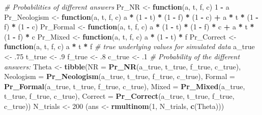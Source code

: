 \documentclass[12pt,]{krantz}
\newenvironment{Shaded}{\begin{snugshade}}{\end{snugshade}}
\newcommand{\KeywordTok}[1]{\textcolor[rgb]{0.13,0.29,0.53}{\textbf{#1}}}
\newcommand{\DataTypeTok}[1]{\textcolor[rgb]{0.13,0.29,0.53}{#1}}
\newcommand{\DecValTok}[1]{\textcolor[rgb]{0.00,0.00,0.81}{#1}}
\newcommand{\FloatTok}[1]{\textcolor[rgb]{0.00,0.00,0.81}{#1}}
\newcommand{\StringTok}[1]{\textcolor[rgb]{0.31,0.60,0.02}{#1}}
\newcommand{\CommentTok}[1]{\textcolor[rgb]{0.56,0.35,0.01}{\textit{#1}}}
\newcommand{\ControlFlowTok}[1]{\textcolor[rgb]{0.13,0.29,0.53}{\textbf{#1}}}
\newcommand{\OperatorTok}[1]{\textcolor[rgb]{0.81,0.36,0.00}{\textbf{#1}}}
\newcommand{\NormalTok}[1]{#1}
\theoremstyle{definition}
\theoremstyle{definition}
\theoremstyle{definition}
\theoremstyle{remark}
\begin{document}
\begin{Shaded}
\begin{Highlighting}[]
\CommentTok{# Probabilities of different answers}
\NormalTok{Pr_NR <-}\StringTok{ }\ControlFlowTok{function}\NormalTok{(a, t, f, c)}
    \DecValTok{1} \OperatorTok{-}\StringTok{ }\NormalTok{a}
\NormalTok{Pr_Neologism <-}\StringTok{ }\ControlFlowTok{function}\NormalTok{(a, t, f, c)}
\NormalTok{    a }\OperatorTok{*}\StringTok{ }\NormalTok{(}\DecValTok{1} \OperatorTok{-}\StringTok{ }\NormalTok{t) }\OperatorTok{*}\StringTok{ }\NormalTok{(}\DecValTok{1} \OperatorTok{-}\StringTok{ }\NormalTok{f) }\OperatorTok{*}\StringTok{ }\NormalTok{(}\DecValTok{1} \OperatorTok{-}\StringTok{ }\NormalTok{c) }\OperatorTok{+}\StringTok{ }\NormalTok{a }\OperatorTok{*}\StringTok{ }\NormalTok{t }\OperatorTok{*}\StringTok{ }\NormalTok{(}\DecValTok{1} \OperatorTok{-}\StringTok{ }\NormalTok{f) }\OperatorTok{*}\StringTok{ }\NormalTok{(}\DecValTok{1} \OperatorTok{-}\StringTok{ }\NormalTok{c)}
\NormalTok{Pr_Formal <-}\StringTok{ }\ControlFlowTok{function}\NormalTok{(a, t, f, c)}
\NormalTok{    a }\OperatorTok{*}\StringTok{ }\NormalTok{(}\DecValTok{1} \OperatorTok{-}\StringTok{ }\NormalTok{t) }\OperatorTok{*}\StringTok{ }\NormalTok{(}\DecValTok{1} \OperatorTok{-}\StringTok{ }\NormalTok{f) }\OperatorTok{*}\StringTok{ }\NormalTok{c }\OperatorTok{+}\StringTok{  }\NormalTok{a }\OperatorTok{*}\StringTok{ }\NormalTok{t }\OperatorTok{*}\StringTok{ }\NormalTok{(}\DecValTok{1} \OperatorTok{-}\StringTok{ }\NormalTok{f) }\OperatorTok{*}\StringTok{ }\NormalTok{c}
\NormalTok{Pr_Mixed <-}\StringTok{ }\ControlFlowTok{function}\NormalTok{(a, t, f, c)}
\NormalTok{    a }\OperatorTok{*}\StringTok{ }\NormalTok{(}\DecValTok{1} \OperatorTok{-}\StringTok{ }\NormalTok{t) }\OperatorTok{*}\StringTok{ }\NormalTok{f}
\NormalTok{Pr_Correct <-}\StringTok{ }\ControlFlowTok{function}\NormalTok{(a, t, f, c)}
\NormalTok{    a }\OperatorTok{*}\StringTok{ }\NormalTok{t }\OperatorTok{*}\StringTok{ }\NormalTok{f}
\CommentTok{# true underlying values for simulated data}
\NormalTok{a_true <-}\StringTok{ }\FloatTok{.75}
\NormalTok{t_true <-}\StringTok{ }\FloatTok{.9}
\NormalTok{f_true <-}\StringTok{ }\FloatTok{.8}
\NormalTok{c_true <-}\StringTok{ }\FloatTok{.1}
\CommentTok{# Probability of the different answers:}
\NormalTok{Theta <-}\StringTok{ }\KeywordTok{tibble}\NormalTok{(}\DataTypeTok{NR =} \KeywordTok{Pr_NR}\NormalTok{(a_true, t_true, f_true, c_true),}
                \DataTypeTok{Neologism =} \KeywordTok{Pr_Neologism}\NormalTok{(a_true, t_true, f_true, c_true),}
                \DataTypeTok{Formal =} \KeywordTok{Pr_Formal}\NormalTok{(a_true, t_true, f_true, c_true),}
                \DataTypeTok{Mixed =} \KeywordTok{Pr_Mixed}\NormalTok{(a_true, t_true, f_true, c_true),}
                \DataTypeTok{Correct =} \KeywordTok{Pr_Correct}\NormalTok{(a_true, t_true, f_true, c_true))}
\NormalTok{N_trials <-}\StringTok{ }\DecValTok{200}
\NormalTok{(ans <-}\StringTok{ }\KeywordTok{rmultinom}\NormalTok{(}\DecValTok{1}\NormalTok{, N_trials, }\KeywordTok{c}\NormalTok{(Theta)))}
\end{Highlighting}
\end{Shaded}
\end{document}
